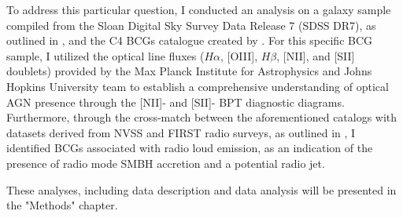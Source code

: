 To address this particular question, I conducted an analysis on a galaxy sample compiled from the Sloan Digital Sky Survey Data Release 7 (SDSS DR7), as outlined in \cite{2009ApJS..182..543A}, and the C4 BCGs catalogue created by \cite{2007MNRAS.379..867V}. For this specific BCG sample, I utilized the optical line fluxes ($H\alpha$, [OIII], $H\beta$, [NII], and [SII] doublets) provided by the Max Planck Institute for Astrophysics and Johns Hopkins University team to establish a comprehensive understanding of optical AGN presence through the [NII]- and [SII]- BPT diagnostic diagrams. Furthermore, through the cross-match between the aforementioned catalogs with datasets derived from NVSS and FIRST radio surveys, as outlined in \cite{2005MNRAS.362....9B}, I identified BCGs associated with radio loud emission, as an indication of the presence of radio mode SMBH accretion and a potential radio jet.

These analyses, including data description and data analysis will be presented in the "Methods" chapter. 

